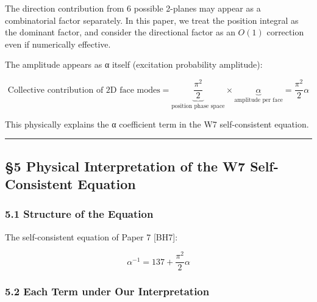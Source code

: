 \documentclass[
  11pt]{article}
\begin{document}
The direction contribution from 6 possible 2-planes may appear as a
combinatorial factor separately. In this paper, we treat the position
integral as the dominant factor, and consider the directional factor as
an \(O(1)\) correction even if numerically effective.

The amplitude appears as α itself (excitation probability amplitude):

\[\text{Collective contribution of 2D face modes} = \underbrace{\frac{\pi^2}{2}}_{\text{position phase space}} \times \underbrace{\alpha}_{\text{amplitude per face}} = \frac{\pi^2}{2} \alpha\]

This physically explains the α coefficient term in the W7
self-consistent equation.

\begin{center}\rule{0.5\linewidth}{0.5pt}\end{center}

\subsection{§5 Physical Interpretation of the W7 Self-Consistent
Equation}\label{physical-interpretation-of-the-w7-self-consistent-equation}

\subsubsection{5.1 Structure of the
Equation}\label{structure-of-the-equation}

The self-consistent equation of Paper 7 {[}BH7{]}:

\[\alpha^{-1} = 137 + \frac{\pi^2}{2}\alpha\]

\subsubsection{5.2 Each Term under Our
Interpretation}\label{each-term-under-our-interpretation}
\end{document}
